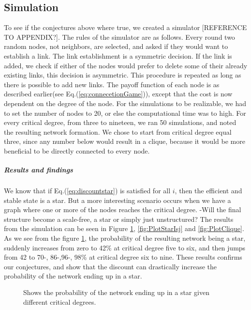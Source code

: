 \subsection{Simulation}
To see if the conjectures above where true, we created a simulator [REFERENCE TO APPENDIX?]. The rules of the simulator are as follows.
Every round two random nodes, not neighbors, are selected, and asked if they would want to establish a link. The link establishment is a symmetric decision. If the link is added, we check if either of the nodes would prefer to delete some of their already existing links, this decision is asymmetric. This procedure is repeated as long as there is possible to add new links. 
The payoff function of each node is as described earlier(see Eq.(\ref{eq:connecetionGame})), except that the cost is now dependent on the degree of the node. For the simulations to be realizable, we had to set the number of nodes to 20, or else the computational time was to high. For every critical degree, from three to nineteen, we ran 50 simulations, and noted the resulting network formation. We chose to start from critical degree equal three, since any number below would result in a clique, because it would be more beneficial to be directly connected to every node.  

\subparagraph{Results and findings}
We know that if Eq.(\ref{eq:discountstar}) is satisfied for all $i$, then the efficient and stable state is a star. But a more interesting scenario occurs when we have a graph where one or more of the nodes reaches the critical degree. -Will the final structure become a scale-free, a star or simply just unstructured? 
The results from the simulation can be seen in Figure \ref{fig:PlotStar}, \ref{fig:PlotStarIsj} and \ref{fig:PlotClique}. As we see from the figure \ref{fig:PlotStar}, the probability of the resulting network being a star, suddenly increases from zero to 42\% at critical degree five to six, and then jumps from 42 to 70-, 86-,96-, 98\% at critical degree six to nine. These results confirms our conjectures, and show that the discount can drastically increase the probability of the network ending up in a star. 

\begin{figure}
\centering
{}
\caption{\label{fig:PlotStar} Shows the probability of the network ending up in a star given different critical degrees.}
\end{figure}

